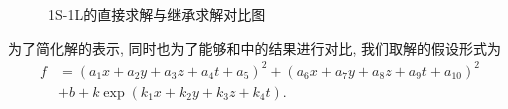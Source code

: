 \begin{figure}[htbp]
\centering
{}
\hspace{2cm}
\caption{1S-1L的直接求解与继承求解对比图} \label{sb1}
\end{figure}

为了简化解的表示, 同时也为了能够和中的结果进行对比, 我们取解的假设形式为
\begin{equation}
\begin{split}
    f&=(a_1 x+a_2 y+a_3 z+ a_4 t +a_5)^2+(a_6 x+a_7 y+a_8 z+ a_9 t +a_{10})^2 \\
    &+b+k \exp(k_1 x + k_2 y +k_3 z+ k_4 t).
\end{split}
\end{equation}

